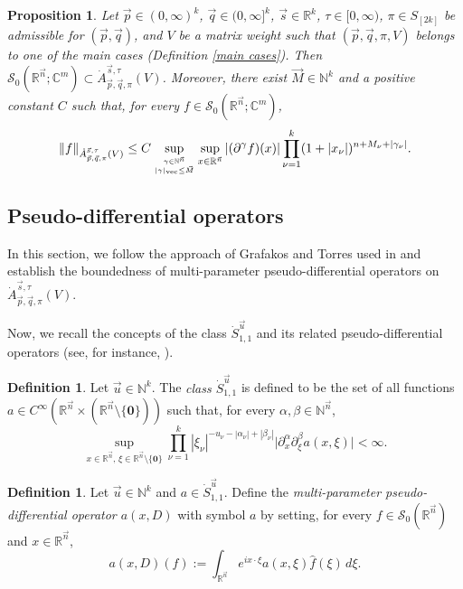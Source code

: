 \documentclass[11pt, reqno]{amsart}
\newtheorem{proposition}[theorem]{Proposition}
\theoremstyle{definition}
\newtheorem{definition}[theorem]{Definition}
\theoremstyle{remark}
\numberwithin{equation}{section}
\newcommand{\C}{\mathbb C}
\newcommand{\N}{\mathbb N}
\newcommand{\R}{\mathbb R}
\newcommand{\vn}{\vec n}
\newcommand{\vp}{\vec p}
\newcommand{\vq}{\vec q}
\newcommand{\vs}{\vec s}
\newcommand{\vu}{\vec u}
\newcommand{\Atau}{\dot A^{\vs,\tau}_{\vp,\vq,\pi}}
\begin{document}
\begin{proposition}\label{6.18}
Let $\vp\in(0,\infty)^k$, $\vq\in(0,\infty]^k$, $\vs\in\R^k$, $\tau\in[0,\infty)$,
$\pi\in S_{[2k]}$ be admissible for $(\vp,\vq)$,
and $V$ be a matrix weight such that $(\vp,\vq,\pi,V)$ belongs
to one of the main cases (Definition \ref{main cases}).
Then $\mathscr{S}_0(\mathbb R^{\vec n};\C^m) \subset \dot A^{\vec s,\tau}_{\vec p,\vec q,\pi}(V)$.
Moreover, there exist $\vec M\in\N^k$
and a positive constant $C$ such that,
for every $f \in \mathscr{S}_0(\mathbb R^{\vec n};\C^m)$,
$$
\|f\|_{\dot A^{\vec s,\tau}_{\vec p,\vec q,\pi}(V)}
\leq C \sup_{\genfrac{}{}{0pt}{}{\gamma\in\N^{\vec n}}{|\gamma|_{\rm{vec}}\leq \vec M}}
\sup_{x\in\mathbb{R}^{\vec n}}|(\partial^{\gamma} f)(x)|
\prod_{\nu=1}^k (1+|x_\nu|)^{n+M_\nu+|\gamma_\nu|}.
$$
\end{proposition}

\subsection{Pseudo-differential operators} \label{pdo}

In this section, we follow the approach of
Grafakos and Torres used in \cite{GT99} and
establish the boundedness of multi-parameter
pseudo-differential operators on $\Atau(V)$.

Now, we recall the concepts of the class $\dot{S}_{1,1}^{\vec u}$
and its related pseudo-differential operators
(see, for instance, \cite[pp.\,261--263]{GT99}).

\begin{definition}\label{1:37}
Let $\vec u\in\mathbb N^k$.
The \emph{class $\dot{S}_{1,1}^{\vec u}$} is defined to be the set of all functions
$a\in C^\infty(\mathbb{R}^{\vn}\times(\mathbb{R}^{\vn}\setminus\{\mathbf 0\}))$
such that, for every $\alpha,\beta\in\mathbb N^{\vec n}$,
$$
\sup_{x\in\mathbb{R}^{\vn},\, \xi\in\mathbb{R}^{\vn}\setminus\{\mathbf{0}\}}
\prod_{\nu=1}^{k}|\xi_\nu|^{-u_\nu-|\alpha_\nu|+|\beta_\nu|}
\Big|\partial_x^\alpha\partial_\xi^\beta a(x,\xi)\Big|
<\infty.
$$
\end{definition}

\begin{definition}\label{def psDO}
Let $\vec u\in\mathbb N^k$ and $a\in\dot{S}_{1,1}^{\vu}$.
Define the \emph{multi-parameter pseudo-differential operator
$a(x,D)$} with symbol $a$ by setting,
for every $f\in \mathscr{S}_0(\R^{\vec n})$ and $x\in\mathbb{R}^{\vn}$,
\begin{equation*}
a(x,D)( f):=\int_{\mathbb{R}^{\vn}}e^{ix\cdot\xi}a(x,\xi)
\widehat{f}(\xi)\,d\xi.
\end{equation*}
\end{definition}
\end{document}
